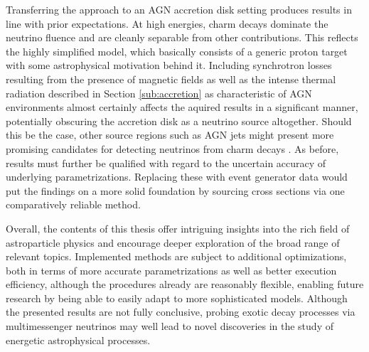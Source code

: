 \begin{spacing}{0.990}
	Transferring the approach to an AGN accretion disk setting produces results in line with prior expectations. At high energies,
	charm decays dominate the neutrino fluence and are cleanly separable from other contributions. This reflects the highly simplified
	model, which basically consists of a generic proton target with some astrophysical motivation behind it. Including synchrotron
	losses resulting from the presence of magnetic fields as well as the intense thermal radiation described in Section \ref{sub:accretion}
	as characteristic of AGN environments almost certainly affects the aquired results in a significant manner, potentially
	obscuring the accretion disk as a neutrino source altogether. Should this be the case, other source regions such as AGN jets
	might present more promising candidates for detecting neutrinos from charm decays \cite{Murase_2023}. As before, results must
	further be qualified with regard to the uncertain accuracy of underlying parametrizations. Replacing these with event generator
	data would put the findings on a more solid foundation by sourcing cross sections via one comparatively reliable method.
	\enlargethispage*{\baselineskip}\newpage
\end{spacing}

Overall, the contents of this thesis offer intriguing insights into the rich field of astroparticle physics and encourage deeper
exploration of the broad range of relevant topics. Implemented methods are subject to additional optimizations, both in terms
of more accurate parametrizations as well as better execution efficiency, although the procedures already are reasonably flexible,
enabling future research by being able to easily adapt to more sophisticated models. Although the presented results are not fully
conclusive, probing exotic decay processes via multimessenger neutrinos may well lead to novel discoveries in the study of
energetic astrophysical processes.
